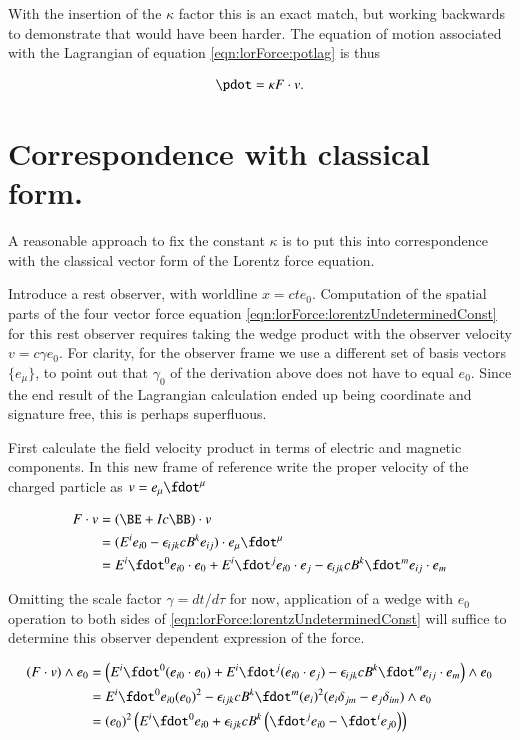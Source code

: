 With the insertion of the $\kappa$ factor this is an exact match, but working backwards to demonstrate that would have been harder.  The equation of motion associated with the Lagrangian of equation \ref{eqn:lorForce:potlag} is thus

\begin{align}\label{eqn:lorForce:lorentzUndeterminedConst}
\pdot = \kappa F \cdot v.
\end{align}

\section{Correspondence with classical form. }

A reasonable approach to fix the constant $\kappa$ is to put this into correspondence with the classical
vector form of the Lorentz force equation.

Introduce a rest observer, with worldline $x = ct e_0$.  Computation of the spatial parts of the four vector force equation \ref{eqn:lorForce:lorentzUndeterminedConst} for this rest observer requires taking the wedge product
with the observer velocity $v = c \gamma e_0$.
For clarity, for the observer frame we use a different set of basis vectors $\{e_\mu\}$, to point
out that $\gamma_0$ of the derivation above does not have to equal $e_0$.  Since the end result of the Lagrangian calculation
ended up being coordinate and signature free, this is perhaps superfluous.

First calculate the field velocity product in terms of electric and magnetic components.  In this new frame of reference write the proper velocity of the charged particle as
$v = e_\mu \fdot^\mu$

\begin{align*}
F \cdot v
&= (\BE + I c \BB) \cdot v \\
&= (E^i e_{i0} - \epsilon_{ijk}c B^k e_{ij}) \cdot e_\mu \fdot^\mu \\
&= 
  E^i \fdot^0 e_{i0} \cdot e_0
+ E^i \fdot^j e_{i0} \cdot e_j
- \epsilon_{ijk} c B^k \fdot^m e_{ij} \cdot e_m \\
\end{align*}

Omitting the scale factor $\gamma = dt/d\tau$ for now, application of a wedge with $e_0$ operation to both sides 
of 
\ref{eqn:lorForce:lorentzUndeterminedConst}
will suffice to determine this observer dependent expression of the force.

\begin{align*}
(F \cdot v) \wedge e_0
&= 
\left(
  E^i \fdot^0 (e_{i0} \cdot e_0)
+ E^i \fdot^j (e_{i0} \cdot e_j)
- \epsilon_{ijk} c B^k \fdot^m e_{ij} \cdot e_m \right) \wedge e_0 \\
&= E^i \fdot^0 e_{i0} (e_0)^2 - \epsilon_{ijk} c B^k \fdot^m (e_i)^2 ( e_{i} \delta_{jm} -e_{j} \delta_{im} ) \wedge e_0 \\
&= (e_0)^2 \left( E^i \fdot^0 e_{i0} + \epsilon_{ijk} c B^k \left( \fdot^j e_{i0} - \fdot^i e_{j0} \right) \right) \\
\end{align*}

